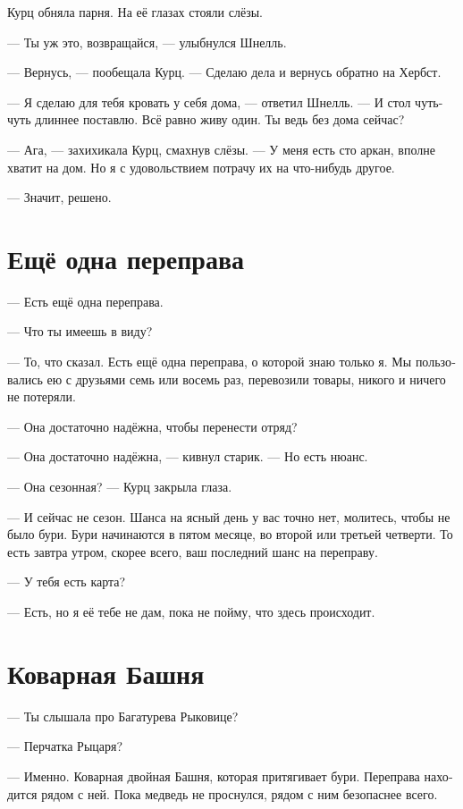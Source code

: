 \documentclass[a4paper,10pt,fleqn]{book}\usepackage{polyglossia}\setdefaultlanguage[babelshorthands=true]{russian}\setotherlanguage{english}\defaultfontfeatures{Ligatures=TeX,Mapping=tex-text}\usepackage{xcolor}\newcommand{\ml}[3]{#2}
\begin{document}
Курц обняла парня.
На её глазах стояли слёзы.

--- Ты уж это, возвращайся, --- улыбнулся Шнелль.

--- Вернусь, --- пообещала Курц.
--- Сделаю дела и вернусь обратно на Хербст.

--- Я сделаю для тебя кровать у себя дома, --- ответил Шнелль.
--- И стол чуть-чуть длиннее поставлю.
Всё равно живу один.
Ты ведь без дома сейчас?

--- Ага, --- захихикала Курц, смахнув слёзы.
--- У меня есть сто аркан, вполне хватит на дом.
Но я с удовольствием потрачу их на что-нибудь другое.

--- Значит, решено.

\section{Ещё одна переправа}

--- Есть ещё одна переправа.

--- Что ты имеешь в виду?

--- То, что сказал.
Есть ещё одна переправа, о которой знаю только я.
Мы пользовались ею с друзьями семь или восемь раз, перевозили товары, никого и ничего не потеряли.

--- Она достаточно надёжна, чтобы перенести отряд?

--- Она достаточно надёжна, --- кивнул старик.
--- Но есть нюанс.

--- Она сезонная? --- Курц закрыла глаза.

--- И сейчас не сезон.
Шанса на ясный день у вас точно нет, молитесь, чтобы не было бури.
Бури начинаются в пятом месяце, во второй или третьей четверти.
То есть завтра утром, скорее всего, ваш последний шанс на переправу.

--- У тебя есть карта?

--- Есть, но я её тебе не дам, пока не пойму, что здесь происходит.

\section{Коварная Башня}

--- Ты слышала про Багатурева Рыковице?

\ml{$0$}
{--- Перчатка Рыцаря?}
{``Knight's Mitten?''}

\ml{$0$}
{--- Именно.}
{``Exactly.}
\ml{$0$}
{Коварная двойная Башня, которая притягивает бури.}
{A treacherous double Tower, which attracts storms.}
Переправа находится рядом с ней.
Пока медведь не проснулся, рядом с ним безопаснее всего.
\end{document}

